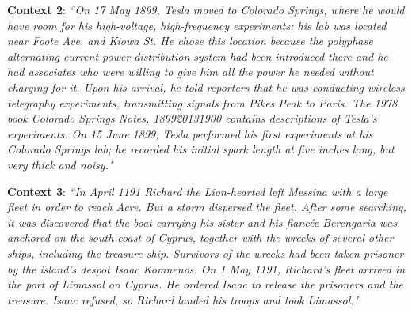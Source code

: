 \documentclass{article}
\begin{document}
\textbf{Context 2}: \textit{``On 17 May 1899, Tesla moved to Colorado Springs, where he would have room for his high-voltage, high-frequency experiments; his lab was located near Foote Ave. and Kiowa St. He chose this location because the polyphase alternating current power distribution system had been introduced there and he had associates who were willing to give him all the power he needed without charging for it. Upon his arrival, he told reporters that he was conducting wireless telegraphy experiments, transmitting signals from Pikes Peak to Paris. The 1978 book Colorado Springs Notes, 1899\u20131900 contains descriptions of Tesla's experiments. On 15 June 1899, Tesla performed his first experiments at his Colorado Springs lab; he recorded his initial spark length at five inches long, but very thick and noisy."}
\begin{table}[h]
\centering
{}
    \caption{Question Generation Results for Context 2: All models, were able to generate the correct question for the given answer and context. T5 small fails to generate a correct syntax.}
    \label{table:q2}
\end{table}
\newline
\newline
\textbf{Context 3}: \textit{``In April 1191 Richard the Lion-hearted left Messina with a large fleet in order to reach Acre. But a storm dispersed the fleet. After some searching, it was discovered that the boat carrying his sister and his fiancée Berengaria was anchored on the south coast of Cyprus, together with the wrecks of several other ships, including the treasure ship. Survivors of the wrecks had been taken prisoner by the island's despot Isaac Komnenos. On 1 May 1191, Richard's fleet arrived in the port of Limassol on Cyprus. He ordered Isaac to release the prisoners and the treasure. Isaac refused, so Richard landed his troops and took Limassol."}
\end{document}
